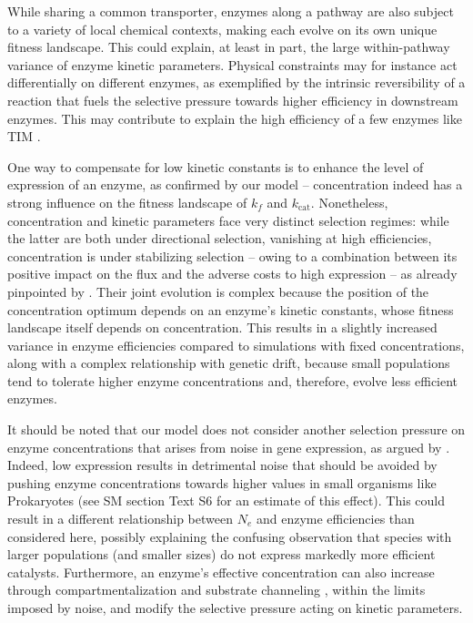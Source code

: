 \documentclass[11pt,onecolumn]{article}
\begin{document}
While sharing a common transporter, enzymes along a pathway are also subject to a variety of local chemical contexts, making each evolve on its own unique fitness landscape. This could explain, at least in part, the large within-pathway variance of enzyme kinetic parameters. Physical constraints may for instance act differentially on different enzymes, as exemplified by the intrinsic reversibility of a reaction that fuels the selective pressure towards higher efficiency in downstream enzymes. This may contribute to explain the high efficiency of a few enzymes like TIM %
\citep{Williamson67,Davidi18}.

One way to compensate for low kinetic constants is to enhance the level of expression of an enzyme, as confirmed by our model -- concentration indeed has a strong influence on the fitness landscape of $k_f$ and $k_\text{cat}$. Nonetheless, concentration and kinetic parameters face very distinct selection regimes: while the latter are both under directional selection, vanishing at high efficiencies, concentration is under stabilizing selection -- owing to a combination between its positive impact on the flux and the adverse costs to high expression -- as already pinpointed by \citet{Chou14}. Their joint evolution is complex because the position of the concentration optimum depends on an enzyme's kinetic constants, whose fitness landscape itself depends on concentration. This results in a slightly increased variance in enzyme efficiencies compared to simulations with fixed concentrations, along with a complex relationship with genetic drift, because small populations tend to tolerate higher enzyme concentrations and, therefore, evolve less efficient enzymes.

It should be noted that our model does not consider another selection pressure on enzyme concentrations that arises from noise in gene expression, as argued by \citet{Wang11}. Indeed, low expression results in detrimental noise that should be avoided by pushing enzyme concentrations towards higher values in small organisms like Prokaryotes (see SM section Text S6 for an estimate of this effect). This could result in a different relationship between $N_e$ and enzyme efficiencies than considered here, possibly explaining the confusing observation that species with larger populations (and smaller sizes) do not express markedly more efficient catalysts. Furthermore, an enzyme's effective concentration can also increase through compartmentalization \citep{Ovadi04,Diekmann13,Cornejo14} and substrate channeling \citep{Welch94,Huang01,Sweetlove18}, within the limits imposed by noise, and modify the selective pressure acting on kinetic parameters.
\end{document}
